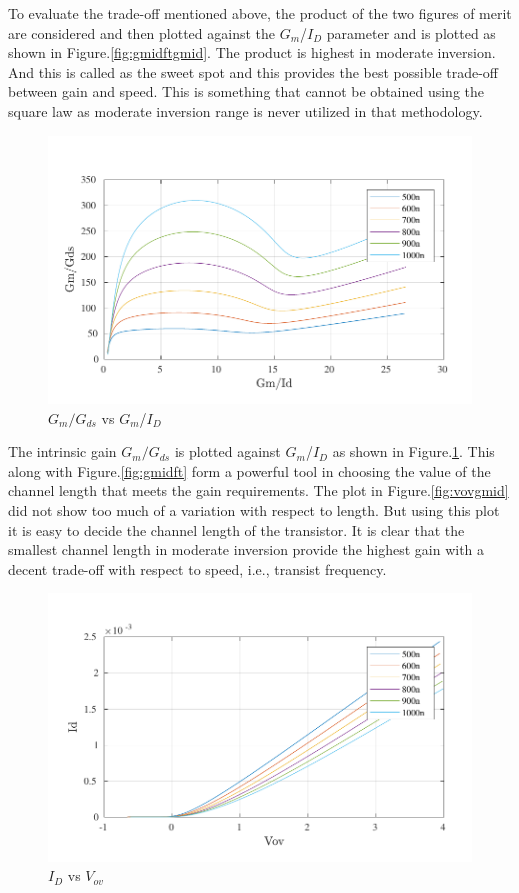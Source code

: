 To evaluate the trade-off mentioned above, the product of the two figures of merit are considered and then plotted against the $G_m$/$I_D$ parameter and is plotted as shown in Figure.\ref{fig:gmidftgmid}. The product is highest in moderate inversion. And this is called as the sweet spot and this provides the best possible trade-off between gain and speed. This is something that cannot be obtained using the square law as moderate inversion range is never utilized in that methodology.

\begin{figure} [H]
\centering
\includegraphics[scale=1]{Figures/Misc/PDFs/nmos_len_gmidgmgds.pdf}
\caption{$G_m/G_{ds}$ vs $G_m$/$I_D$}
\label{fig:gmidgmgds}
\end{figure}

The intrinsic gain $G_m/G_{ds}$ is plotted against $G_m$/$I_D$ as shown in Figure.\ref{fig:gmidgmgds}. This along with Figure.\ref{fig:gmidft} form a powerful tool in choosing the value of the channel length that meets the gain requirements. The plot in Figure.\ref{fig:vovgmid} did not show too much of a variation with respect to length. But using this plot it is easy to decide the channel length of the transistor. It is clear that the smallest channel length in moderate inversion provide the highest gain with a decent trade-off with respect to speed, i.e., transist frequency.

\begin{figure} [H]
\centering
\includegraphics[scale=1]{Figures/Misc/PDFs/nmos_len_vovid.pdf}
\caption{$I_D$ vs $V_{ov}$}
\label{fig:vovid}
\end{figure}

